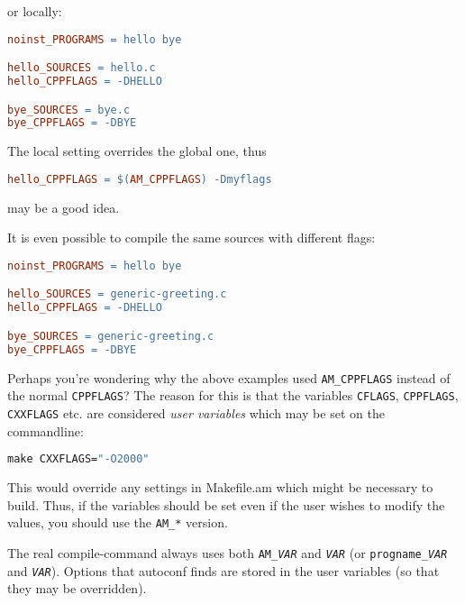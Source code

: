 \documentclass[11pt,a4paper,headinclude,footinclude,DIV16,normalheadings]{scrartcl}
\begin{document}
or locally:

\begin{lstlisting}[language=make]
noinst_PROGRAMS = hello bye

hello_SOURCES = hello.c
hello_CPPFLAGS = -DHELLO

bye_SOURCES = bye.c
bye_CPPFLAGS = -DBYE
\end{lstlisting}

The local setting overrides the global one, thus

\begin{lstlisting}[language=make]
hello_CPPFLAGS = $(AM_CPPFLAGS) -Dmyflags
\end{lstlisting}

may be a good idea.

It is even possible to compile the same sources with different flags:

\begin{lstlisting}[language=make]
noinst_PROGRAMS = hello bye

hello_SOURCES = generic-greeting.c
hello_CPPFLAGS = -DHELLO

bye_SOURCES = generic-greeting.c
bye_CPPFLAGS = -DBYE
\end{lstlisting}

Perhaps you're wondering why the above examples used
\texttt{AM\_CPPFLAGS} instead of the normal \texttt{CPPFLAGS}? The
reason for this is that the variables \texttt{CFLAGS},
\texttt{CPPFLAGS}, \texttt{CXXFLAGS} etc. are considered {\em user
  variables} which may be set on the commandline:

\begin{lstlisting}[language=make]
make CXXFLAGS="-O2000"
\end{lstlisting}

This would override any settings in Makefile.am which might be
necessary to build. Thus, if the variables should be set even if the
user wishes to modify the values, you should use the \texttt{AM\_*}
version. 

The real compile-command always uses both \texttt{AM\_\textit{VAR}} and
\texttt{\textit{VAR}} (or \texttt{\texttt{progname}\_\textit{VAR}} and
\texttt{\textit{VAR}}).  Options that
autoconf finds are stored in the user variables (so that they may be
overridden).
\end{document}
